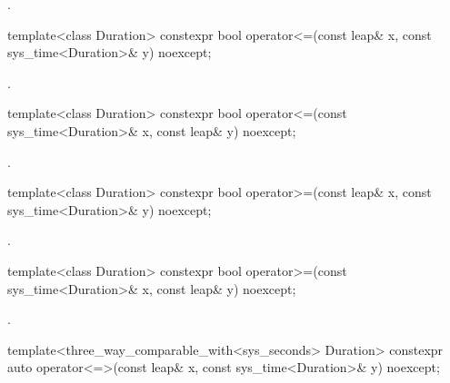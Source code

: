 \begin{itemdescr}
\pnum
\returns
{}.
\end{itemdescr}

%
%
\begin{itemdecl}
template<class Duration>
  constexpr bool operator<=(const leap& x, const sys_time<Duration>& y) noexcept;
\end{itemdecl}

\begin{itemdescr}
\pnum
\returns
{}.
\end{itemdescr}

%
%
\begin{itemdecl}
template<class Duration>
  constexpr bool operator<=(const sys_time<Duration>& x, const leap& y) noexcept;
\end{itemdecl}

\begin{itemdescr}
\pnum
\returns
{}.
\end{itemdescr}

%
%
\begin{itemdecl}
template<class Duration>
  constexpr bool operator>=(const leap& x, const sys_time<Duration>& y) noexcept;
\end{itemdecl}

\begin{itemdescr}
\pnum
\returns
{}.
\end{itemdescr}

%
%
\begin{itemdecl}
template<class Duration>
  constexpr bool operator>=(const sys_time<Duration>& x, const leap& y) noexcept;
\end{itemdecl}

\begin{itemdescr}
\pnum
\returns
{}.
\end{itemdescr}

%
%
\begin{itemdecl}
template<three_way_comparable_with<sys_seconds> Duration>
  constexpr auto operator<=>(const leap& x, const sys_time<Duration>& y) noexcept;
\end{itemdecl}

